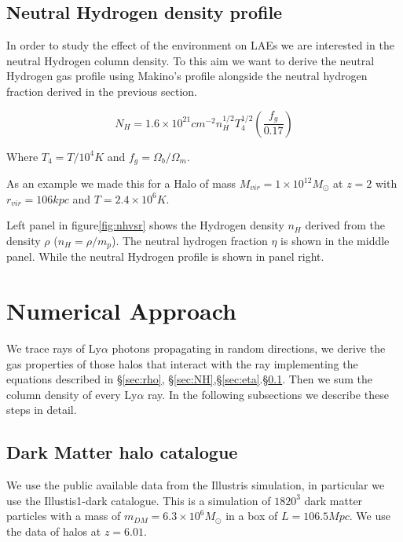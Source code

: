 \documentclass[a4,useAMS,usenatbib,usegraphicx]{mn2e}
\begin{document}
\subsection{Neutral Hydrogen density profile}\label{sec:NHI}

In order to study the effect of the environment on LAEs we are
interested in the neutral Hydrogen column density.
To this aim we want to derive the neutral Hydrogen gas profile using Makino's profile
alongside the neutral hydrogen fraction derived in the previous section.

\begin{equation}
N_H = 1.6 \times 10^{21} cm^{-2} n_H^{1/2}T_4^{1/2}\left(\dfrac{f_g}{0.17} \right)
\end{equation}

Where $T_4 = T/10^{4}K$ and $f_g =\Omega_b/ \Omega_m$.

As an example we made this for a Halo of mass $M_{vir} = 1 \times
10^{12} M_{\odot}$ at $z=2$ with $r_{vir}=106kpc$ and $T =2.4\times10^{6}K$.

Left panel in figure\ref{fig:nhvsr} shows the Hydrogen density $n_H$ derived from the density $\rho$
($n_H = \rho / m_p$). The neutral hydrogen fraction $\eta$ is shown in
the middle panel. While the neutral Hydrogen profile is shown in panel
right.


\section{Numerical Approach}

We trace rays of Ly$\alpha$ photons propagating in random directions, we derive
the gas properties of those halos that interact with the ray
implementing the equations described in \S \ref{sec:rho},
\S \ref{sec:NH},\S \ref{sec:eta}.\S \ref{sec:NHI}. Then we sum the column
density of every Ly$\alpha$ ray. In the following subsections we describe
these steps in detail.

\subsection{Dark Matter halo catalogue}

We use the public available data from the Illustris simulation, in particular we use
the Illustis1-dark catalogue. This is a simulation of $1820^3$ dark matter particles
with a mass of $m_{DM}=6.3 \times 10^6 M_{\odot}$ in a box of $L=106.5 Mpc$. We use
the data of halos at $z = 6.01$.
\end{document}
